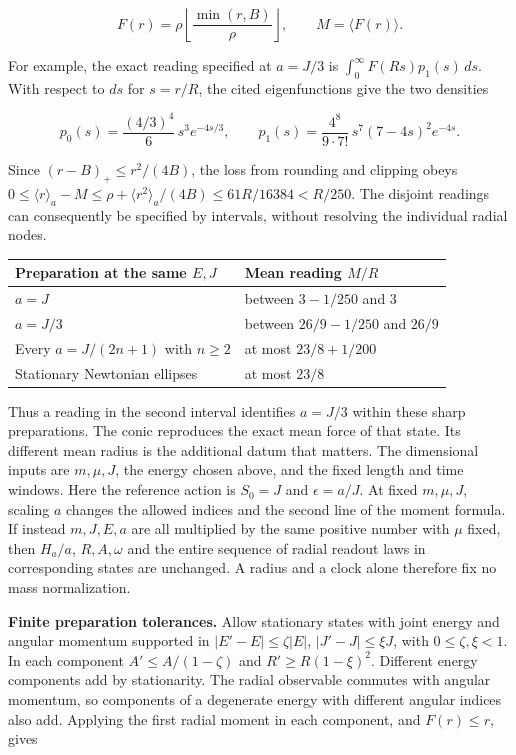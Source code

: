 \documentclass[11pt,a4paper]{article}
\begin{document}
\[
 F(r)=\rho\left\lfloor\frac{\min(r,B)}{\rho}\right\rfloor,\qquad
 M=\langle F(r)\rangle .
\]

For example, the exact reading specified at \(a=J/3\) is
\(\int_0^\infty F(Rs)p_1(s)\,ds\). With respect to \(ds\) for \(s=r/R\),
the cited eigenfunctions give the two densities

\[
 p_0(s)=\frac{(4/3)^4}{6}\,s^3 e^{-4s/3},\qquad
 p_1(s)=\frac{4^8}{9\cdot7!}\,s^7(7-4s)^2e^{-4s}.
\]

Since \((r-B)_+\le r^2/(4B)\), the loss from rounding and clipping obeys
\(0\le\langle r\rangle_a-M\le\rho+\langle r^2\rangle_a/(4B)
\le61R/16384<R/250\). The disjoint readings can consequently be
specified by intervals, without resolving the individual radial nodes.

\begin{longtable}[]{@{}ll@{}}
\toprule\noalign{}
Preparation at the same \(E,J\) & Mean reading \(M/R\) \\
\midrule\noalign{}
\endhead
\bottomrule\noalign{}
\endlastfoot
\(a=J\) & between \(3-1/250\) and \(3\) \\
\(a=J/3\) & between \(26/9-1/250\) and \(26/9\) \\
Every \(a=J/(2n+1)\) with \(n\ge2\) & at most \(23/8+1/200\) \\
Stationary Newtonian ellipses & at most \(23/8\) \\
\end{longtable}

Thus a reading in the second interval identifies \(a=J/3\) within these
sharp preparations. The conic reproduces the exact mean force of that
state. Its different mean radius is the additional datum that matters.
The dimensional inputs are \(m,\mu,J\), the energy chosen above, and the
fixed length and time windows. Here the reference action is \(S_0=J\)
and \(\epsilon=a/J\). At fixed \(m,\mu,J\), scaling \(a\) changes the
allowed indices and the second line of the moment formula. If instead
\(m,J,E,a\) are all multiplied by the same positive number with \(\mu\)
fixed, then \(H_a/a\), \(R,A,\omega\) and the entire sequence of radial
readout laws in corresponding states are unchanged. A radius and a clock
alone therefore fix no mass normalization.

\textbf{Finite preparation tolerances.} Allow stationary states with
joint energy and angular momentum supported in \(|E'-E|\le\zeta |E|\),
\(|J'-J|\le\xi J\), with \(0\le\zeta,\xi<1\). In each component
\(A'\le A/(1-\zeta)\) and \(R'\ge R(1-\xi)^2\). Different energy
components add by stationarity. The radial observable commutes with
angular momentum, so components of a degenerate energy with different
angular indices also add. Applying the first radial moment in each
component, and \(F(r)\le r\), gives
\end{document}
